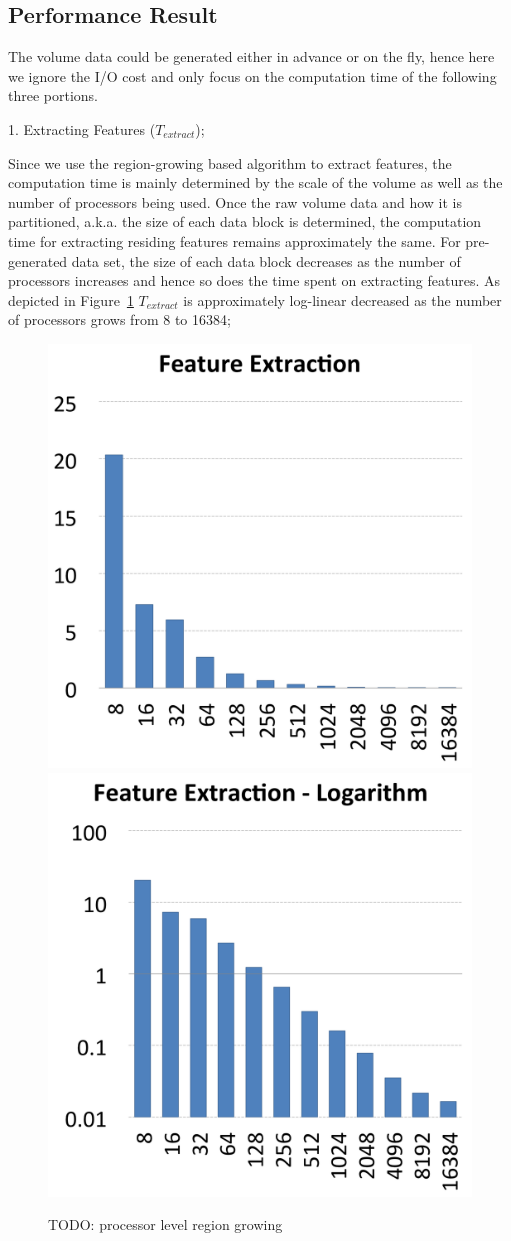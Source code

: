 \documentclass[10pt, conference, compsocconf]{IEEEtran}
\begin{document}
\subsection{Performance Result}
The volume data could be generated either in advance or on the fly, hence here we ignore the I/O cost and only focus on the computation time of the following three portions.

1. Extracting Features ($T_{extract}$);

Since we use the region-growing based algorithm to extract features, the computation time is mainly determined by the scale of the volume as well as the number of processors being used. Once the raw volume data and how it is partitioned, a.k.a. the size of each data block is determined, the computation time for extracting residing features remains approximately the same. For pre-generated data set, the size of each data block decreases as the number of processors increases and hence so does the time spent on extracting features. As depicted in Figure~\ref{fig:feature-extraction} $T_{extract}$ is approximately log-linear decreased as the number of processors grows from 8 to 16384;

\begin{figure}[ht]
	\centering
	\includegraphics[width=0.45\linewidth]{feature_extraction.png}
	\includegraphics[width=0.45\linewidth]{feature_extraction_log.png}
	\caption{TODO: processor level region growing}
	\label{fig:feature-extraction}
\end{figure}
\end{document}
